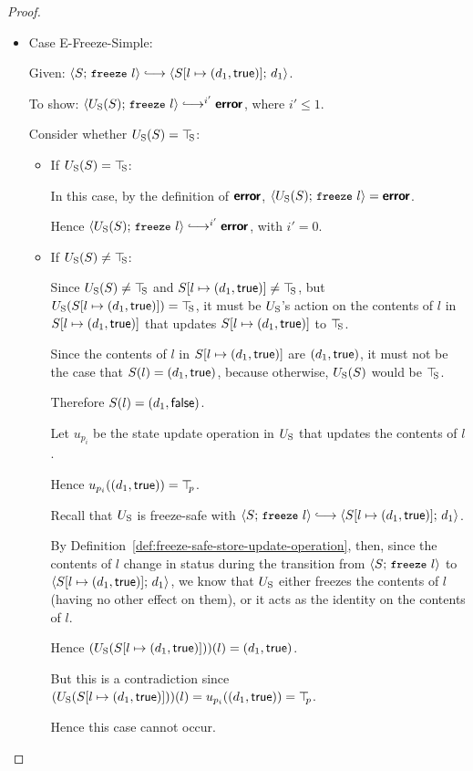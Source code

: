 \begin{proof}
\begin{itemize}
  \item Case {\sc E-Freeze-Simple}:

    Given: $\config{S}{\freeze{l}} \parstepsto
    \config{\extS{S}{l}{d_1}{\frozentrue}}{d_1}$.

    To show: $\config{\Ustore(S)}{\freeze{l}} \parstepsto^{i'} \error$,
    where $i' \leq 1$.

    Consider whether $U_{\mathrm{S}}(S) = \top\hspace{-0.85mm}_{\mathrm{S}}$:
    \begin{itemize}

    \item If $U_{\mathrm{S}}(S) = \top\hspace{-0.85mm}_{\mathrm{S}}$:

      In this case, by the definition of $\textbf{\textsf{error}}$,
      $\langle U_{\mathrm{S}}(S);\, \mbox{\small{\texttt{freeze}}}~l \rangle = \textbf{\textsf{error}}$.

      Hence $\config{\Ustore(S)}{\freeze{l}}
      \parstepsto^{i'} \error$, with $i' = 0$.

    \item If $U_{\mathrm{S}}(S) \neq \top\hspace{-0.85mm}_{\mathrm{S}}$:

      Since $U_{\mathrm{S}}(S) \neq \top\hspace{-0.85mm}_{\mathrm{S}}$ and $S[l \mapsto (d_1, \textsf{true})]
      \neq \top\hspace{-0.85mm}_{\mathrm{S}}$, but $U_{\mathrm{S}}(S[l \mapsto (d_1, \textsf{true})]) = \top\hspace{-0.85mm}_{\mathrm{S}}$,
      it must be $U_{\mathrm{S}}$'s action on the contents of $l$ in
      $S[l \mapsto (d_1, \textsf{true})]$ that updates
      $S[l \mapsto (d_1, \textsf{true})]$ to $\top\hspace{-0.85mm}_{\mathrm{S}}$.

      Since the contents of $l$ in $S[l \mapsto (d_1, \textsf{true})]$ are
      $(d_1, \textsf{true})$, it must not be the case that $S(l) =
      (d_1, \textsf{true})$, because otherwise, $U_{\mathrm{S}}(S)$ would be
      $\top\hspace{-0.85mm}_{\mathrm{S}}$.

      Therefore $S(l) = (d_1, \textsf{false})$.

      Let $u_{p_i}$ be the state update operation in $U_{\mathrm{S}}$ that
      updates the contents of $l$.

      Hence $u_{p_i}((d_1, \textsf{true})) = \top\hspace{-0.85mm}_{p}$.

      Recall that $U_{\mathrm{S}}$ is freeze-safe with $\config{S}{\freeze{l}}
      \parstepsto \config{\extS{S}{l}{d_1}{\frozentrue}}{d_1}$.

      By Definition~\ref{def:freeze-safe-store-update-operation},
      then, since the contents of $l$ change in status during the
      transition from $\langle S;\, \mbox{\small{\texttt{freeze}}}~l \rangle$ to
      $\langle S[l \mapsto (d_1, \textsf{true})];\, d_1 \rangle$, we know that
      $U_{\mathrm{S}}$ either freezes the contents of $l$ (having no other effect
      on them), or it acts as the identity on the contents of $l$.

      Hence $(U_{\mathrm{S}}(S[l \mapsto (d_1, \textsf{true})]))(l) =
      (d_1, \textsf{true})$.

      But this is a contradiction since
      $(U_{\mathrm{S}}(S[l \mapsto (d_1, \textsf{true})]))(l) =
      u_{p_i}((d_1, \textsf{true})) = \top\hspace{-0.85mm}_{p}$.

      Hence this case cannot occur.
    \end{itemize}

  \end{itemize}
\end{proof}
